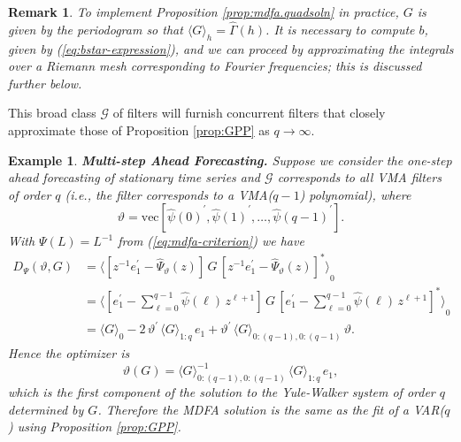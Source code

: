 \documentclass[a4paper]{book}
\def\tends{\rightarrow}
\newtheorem{Example}{Example}
\newtheorem{Remark}{Remark}
\begin{document}
\vspace{.5cm}


\begin{Remark} \rm
\label{rem:matrix.mdfa.soln}
 To implement Proposition \ref{prop:mdfa.quadsoln} in practice, $G$ is given by the
 periodogram so that ${ \langle G \rangle }_h = \widehat{\Gamma} (h)$.  
  It is necessary to compute $b$, given by (\ref{eq:bstar-expression}), 
  and we can proceed by approximating the integrals over a Riemann mesh corresponding
 to Fourier frequencies; this is discussed further below.
\end{Remark}

   This broad class $\mathcal{G}$ of filters
  will furnish concurrent filters that closely approximate those of
 Proposition \ref{prop:GPP} as $ q \tends \infty$.

\begin{Example} {\bf Multi-step Ahead Forecasting.}  \rm
\label{exam:multi-step.fore.4}
  Suppose we consider the   one-step ahead forecasting of stationary time series and
 $\mathcal{G} $ corresponds to   all VMA filters of   order $q$
  (i.e., the filter corresponds to a VMA($q-1$) polynomial), where  
\[
 \vartheta  = \mbox{vec} [{\widehat{\psi} (0) }^{\prime},
 {\widehat{\psi} (1) }^{\prime},   \ldots,
  {\widehat{\psi} (q-1) }^{\prime} ].
\]
 With $\Psi (L) = L^{-1}$ from (\ref{eq:mdfa-criterion}) we
 have 
\begin{align*}
 D_{\Psi} (\vartheta, G) & = 
 { \langle  \left[ z^{-1} e_1^{\prime} -  \widehat{\Psi}_{\vartheta} (z) \right] \,   G \,
  {  \left[ z^{-1} e_1^{\prime} -  \widehat{\Psi}_{\vartheta} (z) \right] }^{*} \rangle }_0 \\
 & = { \langle  \left[ e_1^{\prime} -  \sum_{\ell = 0}^{q-1} \widehat{\psi} (\ell)
    \, z^{\ell+1} \right] \, 
  G \,   {  \left[ e_1^{\prime} -  
 \sum_{\ell = 0}^{q-1} \widehat{\psi} (\ell) \, z^{\ell+1} \right]
  }^{*} \rangle }_0 \\
 & = { \langle G \rangle }_0 - 2 \, \vartheta^{\prime} \, { \langle G \rangle }_{1:q} 
 \, e_1    + \vartheta^{\prime} \, { \langle G \rangle }_{0:(q-1),0:(q-1)} \, \vartheta.
\end{align*}
 Hence the  optimizer is 
\[
 \vartheta (G) = { \langle G \rangle }_{0:(q-1),0:(q-1)}^{-1} \, 
   { \langle G \rangle }_{1:q} \, e_1,
\]
 which is the first component of the solution to the Yule-Walker system of order 
  $q$ determined by $G$.
  Therefore the MDFA solution is the same as the fit of a VAR($q$) using 
 Proposition \ref{prop:GPP}.
\end{Example}
 
\end{document}
